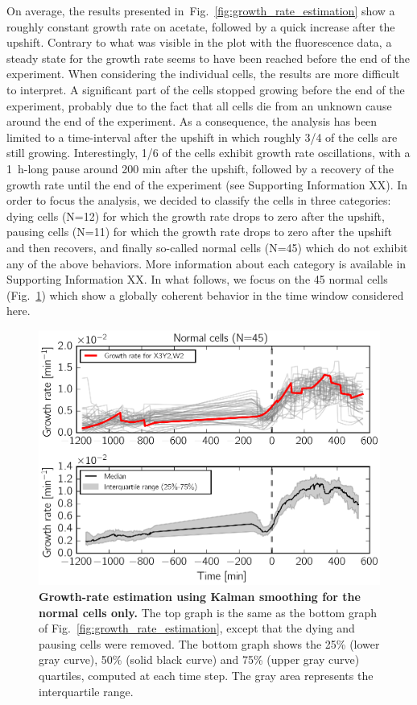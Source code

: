 On average, the results presented in~Fig.~\ref{fig:growth_rate_estimation} show a roughly constant growth rate on acetate, followed by a quick increase after the upshift.
Contrary to what was visible in the plot with the fluorescence data, a steady state for the growth rate seems to have been reached before the end of the experiment.
When considering the individual cells, the results are more difficult to interpret.
A significant part of the cells stopped growing before the end of the experiment, probably due to the fact that all cells die from an unknown cause around the end of the experiment. 
As a consequence, the analysis has been limited to a time-interval after the upshift in which roughly 3/4 of the cells are still growing.
Interestingly, 1/6 of the cells exhibit growth rate oscillations, with a 1~h-long pause around 200 min after the upshift, followed by a recovery of the growth rate until the end of the experiment (see Supporting Information XX).
In order to focus the analysis, we decided to classify the cells in three categories: dying cells (N=12) for which the growth rate drops to zero after the upshift, pausing cells (N=11) for which the growth rate drops to zero after the upshift and then recovers, and finally so-called normal cells (N=45) which do not exhibit any of the above behaviors.
More information about each category is available in Supporting Information XX.
In what follows, we focus on the 45 normal cells (Fig.~\ref{fig:growth_rate_estimation_median}) which show a globally coherent behavior in the time window considered here.

\begin{figure}[tb]
\centering
\includegraphics[scale=1]{./Fig/growth_rate_estimation_median}
\caption{
\textbf{Growth-rate estimation using Kalman smoothing for the normal cells only.}
The top graph is the same as the bottom graph of Fig.~\ref{fig:growth_rate_estimation}, except that the dying and pausing cells were removed.
The bottom graph shows the 25\% (lower gray curve), 50\% (solid black curve) and 75\% (upper gray curve) quartiles, computed at each time step.
The gray area represents the interquartile range.
}
\label{fig:growth_rate_estimation_median}
\end{figure}

